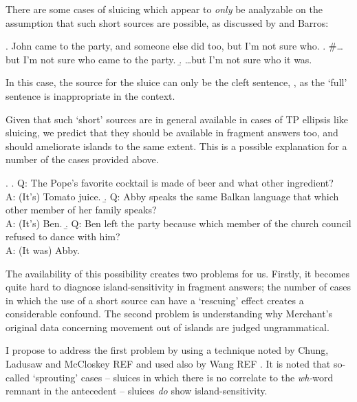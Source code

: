 \documentclass[11pt,letterpaper]{article}
\begin{document}

There are some cases of sluicing which appear to \emph{only} be analyzable on the assumption that such short sources are possible, as discussed by \cite{vC10} and Barros: %

\ex. 	John came to the party, and someone else did too, but I'm not sure who.
	\a. \#\ldots but I'm not sure who came to the party.
	\b. \ldots but I'm not sure who it was.
	
In this case, the source for the sluice can only be the cleft sentence, \Last[b], as the `full' sentence \Last[a] is inappropriate in the context.

Given that such `short' sources are in general available in cases of TP ellipsis like sluicing, we predict that they should be available in fragment answers too, and should ameliorate islands to the same extent. This is a possible explanation for a number of the cases provided above.

\ex. 	\a. Q: The Pope's favorite cocktail is made of beer and what other ingredient?\\
	A: (It's) Tomato juice.
	\b. Q: Abby speaks the same Balkan language that which other member of her family speaks?\\
	    A: (It's) Ben.
	 \b. Q: Ben left the party because which member of the church council refused to dance with him?\\
	 	A: (It was) Abby.

The availability of this possibility creates two problems for us. Firstly, it becomes quite hard to diagnose island-sensitivity in fragment answers; the number of cases in which the use of a short source can have a `rescuing' effect creates a considerable confound. The second problem is understanding why Merchant's original data concerning movement out of islands %
are judged ungrammatical.

I propose to address the first problem by using a technique noted by Chung, Ladusaw and McCloskey REF %
and used also by Wang REF %
. It is noted that so-called `sprouting' cases -- sluices in which there is no correlate to the {\it wh-}word remnant in the antecedent -- sluices \emph{do} show island-sensitivity. 
\end{document}
